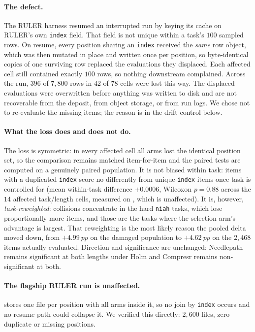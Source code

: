 \documentclass[11pt]{article}
\newcommand{\pp}{~pp}          %
\newcommand{\NP}{Needlepath}
\newcommand{\fn}[1]{{\ttfamily\seqsplit{#1}}}   %
\begin{document}
\paragraph{The defect.} The RULER harness resumed an interrupted run by keying its cache on
RULER's own \texttt{index} field. That field is not unique within a task's $100$ sampled rows.
On resume, every position sharing an \texttt{index} received the \emph{same} row object, which
was then mutated in place and written once per position, so byte-identical copies of one
surviving row replaced the evaluations they displaced. Each affected cell still contained
exactly $100$ rows, so nothing downstream complained. Across the run, $396$ of $7{,}800$ rows in
$42$ of $78$ cells were lost this way. The displaced evaluations were overwritten before anything
was written to disk and are not recoverable from the deposit, from object storage, or from run
logs. We chose not to re-evaluate the missing items; the reason is in the drift control below.

\paragraph{What the loss does and does not do.} The loss is symmetric: in every affected cell all
arms lost the identical position set, so the comparison remains matched item-for-item and the
paired tests are computed on a genuinely paired population. It is not biased within task: items
with a duplicated \texttt{index} score no differently from unique-\texttt{index} items once task
is controlled for (mean within-task difference $+0.0006$, Wilcoxon $p{=}0.88$ across the $14$
affected task/length cells, measured on \fn{ruler\_v1}, which is unaffected). It is, however,
\emph{task-reweighted}: collisions concentrate in the hard \texttt{niah} tasks, which lose
proportionally more items, and those are the tasks where the selection arm's advantage is
largest. That reweighting is the most likely reason the pooled delta moved down, from
$+4.99\pp$ on the damaged population to $+4.62\pp$ on the $2{,}468$ items actually evaluated.
Direction and significance are unchanged: \NP{} remains significant at both lengths under Holm
and Compresr remains non-significant at both.

\paragraph{The flagship RULER run is unaffected.} \fn{ruler\_v1} stores one file per position with
all arms inside it, so no join by \texttt{index} occurs and no resume path could collapse it.
We verified this directly: $2{,}600$ files, zero duplicate or missing positions.
\end{document}
